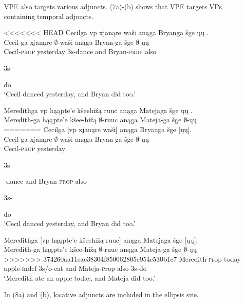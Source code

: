 \documentclass[output=paper]{LSP/langsci}
\begin{document}
VPE also targets various adjuncts. (7a)-(b) shows that VPE targets VPs containing temporal adjuncts. 

\begin{exe}
\ex
\begin{xlist}
\ex
<<<<<<< HEAD
\glll Cecilga {\ob}{vp} xjanąre waši{\cb} anąga Bryanga šge {\ob}ųų{\cb} .\\
Cecil-ga {} xjanąre $\emptyset$-waši anąga Bryan-ga šge $\emptyset$-ųų\\
Cecil-\textsc{prop} {} yesterday \textsc{3s}-dance and Bryan-\textsc{prop} also \begin{sc}3s-\end{sc}do\\
\trans `Cecil danced yesterday, and Bryan did too.'

\ex
\glll Meredithga  {\ob}{vp} hąąpte'e kšeehižą ruuc{\cb} anąga Matejaga šge {\ob}ųų{\cb} .\\
Meredith-ga {} hąąpte'e kšee-hižą $\emptyset$-ruuc anąga Mateja-ga šge $\emptyset$-ųų\\
=======
\glll Cecilga {\textsc [vp} xjan\k{a}re wa\v{s}i{\textsc ]} an\k{a}ga Bryanga \v{s}ge {\textsc [}\k{u}\k{u}{\textsc ]}.\\
Cecil-ga {} xjan\k{a}re $\emptyset$-wa\v{s}i an\k{a}ga Bryan-ga \v{s}ge $\emptyset$-\k{u}\k{u}\\
Cecil-\textsc{prop} {} yesterday \begin{sc}3s\end{sc}-dance and Bryan-\textsc{prop} also \begin{sc}3s-\end{sc}do\\
\trans `Cecil danced yesterday, and Bryan did too.'

\ex
\glll Meredithga  {\textsc [vp} h\k{a}\k{a}pte'e k\v{s}eehi\v{z}\k{a} ruuc{\textsc ]} an\k{a}ga Matejaga \v{s}ge {\textsc [}\k{u}\k{u}{\textsc ]}.\\
Meredith-ga {} h\k{a}\k{a}pte'e k\v{s}ee-hi\v{z}\k{a} $\emptyset$-ruuc an\k{a}ga Mateja-ga \v{s}ge $\emptyset$-\k{u}\k{u}\\
>>>>>>> 374260aa11eac38304f850062805c954c530b1e7
Meredith-{\textsc prop} {} today apple-{\textsc indef} {\textsc 3s/o}-eat and Mateja-{\textsc prop} also {\textsc 3s}-do\\
\trans `Meredith ate an apple today, and Mateja did too.'
\end{xlist}
\end{exe}

In (8a) and (b), locative adjuncts are included in the ellipsis site. 
\end{document}
